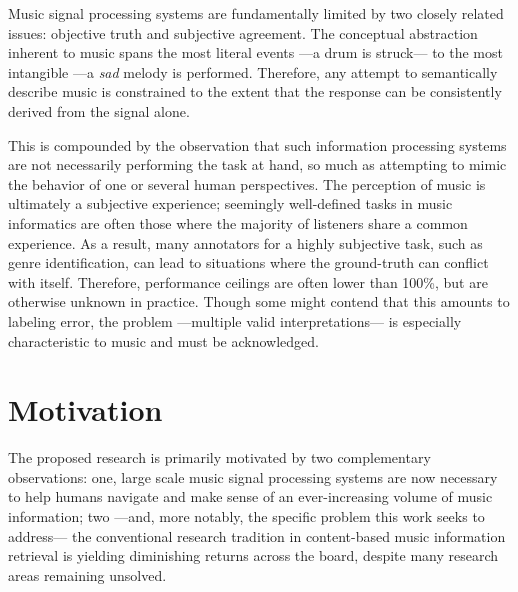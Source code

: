 Music signal processing systems are fundamentally limited by two closely related issues: objective truth and subjective agreement.
The conceptual abstraction inherent to music spans the most literal events ---a drum is struck--- to the most intangible ---a \emph{sad} melody is performed.
Therefore, any attempt to semantically describe music is constrained to the extent that the response can be consistently derived from the signal alone.

This is compounded by the observation that such information processing systems are not necessarily  performing the task at hand, so much as attempting to mimic the behavior of one or several human perspectives.
The perception of music is ultimately a subjective experience; seemingly well-defined tasks in music informatics are often those where the majority of listeners share a common experience.
As a result, many annotators for a highly subjective task, such as genre identification, can lead to situations where the ground-truth can conflict with itself.
Therefore, performance ceilings are often lower than 100\%, but are otherwise unknown in practice.
Though some might contend that this amounts to labeling error, the problem ---multiple valid interpretations--- is especially characteristic to music and must be acknowledged.





\section{Motivation}


The proposed research is primarily motivated by two complementary observations:
one, large scale music signal processing systems are now necessary to help humans navigate and make sense of an ever-increasing volume of music information;
two ---and, more notably, the specific problem this work seeks to address--- the conventional research tradition in content-based music information retrieval is yielding diminishing returns across the board, despite many research areas remaining unsolved.

